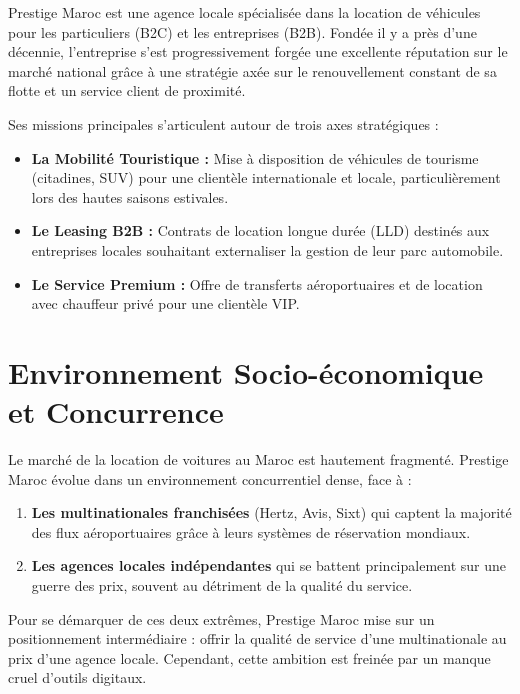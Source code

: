 \documentclass[12pt, a4paper]{report}
\begin{document}
Prestige Maroc est une agence locale spécialisée dans la location de véhicules pour les particuliers (B2C) et les entreprises (B2B). Fondée il y a près d'une décennie, l'entreprise s'est progressivement forgée une excellente réputation sur le marché national grâce à une stratégie axée sur le renouvellement constant de sa flotte et un service client de proximité. 

Ses missions principales s'articulent autour de trois axes stratégiques :
\begin{itemize}
    \item \textbf{La Mobilité Touristique :} Mise à disposition de véhicules de tourisme (citadines, SUV) pour une clientèle internationale et locale, particulièrement lors des hautes saisons estivales.
    \item \textbf{Le Leasing B2B :} Contrats de location longue durée (LLD) destinés aux entreprises locales souhaitant externaliser la gestion de leur parc automobile.
    \item \textbf{Le Service Premium :} Offre de transferts aéroportuaires et de location avec chauffeur privé pour une clientèle VIP.
\end{itemize}

\section{Environnement Socio-économique et Concurrence}
Le marché de la location de voitures au Maroc est hautement fragmenté. Prestige Maroc évolue dans un environnement concurrentiel dense, face à :
\begin{enumerate}
    \item \textbf{Les multinationales franchisées} (Hertz, Avis, Sixt) qui captent la majorité des flux aéroportuaires grâce à leurs systèmes de réservation mondiaux.
    \item \textbf{Les agences locales indépendantes} qui se battent principalement sur une guerre des prix, souvent au détriment de la qualité du service.
\end{enumerate}
Pour se démarquer de ces deux extrêmes, Prestige Maroc mise sur un positionnement intermédiaire : offrir la qualité de service d'une multinationale au prix d'une agence locale. Cependant, cette ambition est freinée par un manque cruel d'outils digitaux.
\end{document}

